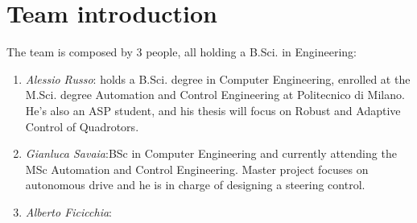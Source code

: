\chapter*{Team introduction}

The team is composed by 3 people, all holding a B.Sci. in Engineering: 
\begin{enumerate}
\item \emph{Alessio Russo}: holds a B.Sci. degree in Computer Engineering, enrolled at the M.Sci. degree Automation and Control Engineering at Politecnico di Milano. He's also an ASP student, and his thesis will focus on Robust and Adaptive Control of Quadrotors.
\item \emph{Gianluca Savaia}:BSc in Computer Engineering and currently attending the MSc Automation and Control Engineering. Master project focuses on autonomous drive and he is in charge of designing a steering control.

\item \emph{Alberto Ficicchia}:
\end{enumerate}